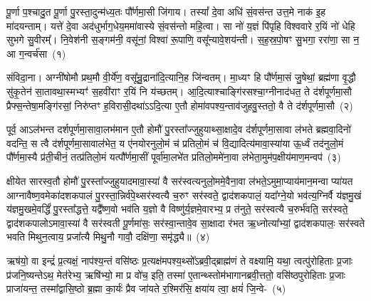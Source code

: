 \setcounter{anuvakam}{0}
पू॒र्णा प॒श्चादु॒त पू॒र्णा पु॒रस्ता॒दुन्म॑ध्य॒तः पौ᳚र्णमा॒सी जि॑गाय। तस्यां᳚ दे॒वा अधि॑ सं॒वस॑न्त उत्त॒मे नाक॑ इ॒ह मा॑दयन्ताम्। यत्ते॑ दे॒वा अद॑धुर्भाग॒\-धेय॒ममा॑वास्ये सं॒वस॑न्तो महि॒त्वा। सा नो॑ य॒ज्ञं पि॑पृहि विश्ववारे र॒यिं नो॑ धेहि सुभगे सु॒वीरम्᳚। नि॒वेश॑नी स॒ङ्गम॑नी॒ वसू॑नां॒ विश्वा॑ रू॒पाणि॒ वसू᳚न्यावे॒शय॑न्ती। स॒ह॒स्र॒पो॒षꣳ सु॒भगा॒ ररा॑णा॒ सा न॒ आ ग॒न्वर्च॑सा~(१)\ip

संविदा॒ना। अग्नी॑षोमौ प्रथ॒मौ वी॒र्ये॑ण॒ वसू᳚न्रु॒द्राना॑दि॒त्यानि॒ह जि॑न्वतम्। मा॒ध्यꣳ हि पौ᳚र्णमा॒सं जु॒षेथां॒ ब्रह्म॑णा वृ॒द्धौ सु॑कृ॒तेन॑ सा॒तावथा॒स्मभ्यꣳ॑ स॒हवी॑राꣳ र॒यिं नि य॑च्छतम्। आ॒दि॒त्याश्चाङ्गि॑रसश्चा॒ग्नीनाद॑धत॒ ते द॑र्\mbox{}शपूर्णमा॒सौ प्रैफ्स॒न्तेषा॒\-मङ्गि॑रसां॒ निरु॑प्तꣳ ह॒विरासी॒दथा॑\-ऽऽ\-दि॒त्या ए॒तौ होमा॑वपश्य॒न्ता\-व॑जुहवु॒स्ततो॒ वै ते द॑र्\mbox{}शपूर्णमा॒सौ~(२)\ip

पूर्व॒ आ\-ऽल॑भन्त दर्\mbox{}श\-पूर्ण\-मा॒सावा॒लभ॑मान ए॒तौ होमौ॑ पु॒रस्ता᳚ज्जुहुयाथ्सा॒क्षादे॒व द॑र्\mbox{}शपूर्णमा॒सावा ल॑भते ब्रह्मवा॒दिनो॑ वदन्ति॒ स त्वै द॑र्\mbox{}शपूर्णमा॒सावा\-ल॑भेत॒ य ए॑नयोरनुलो॒मं च॑ प्रतिलो॒मं च॑ वि॒द्यादित्य॑मावा॒स्या॑या ऊ॒र्ध्वं तद॑नुलो॒मं पौ᳚र्णमा॒स्यै प्र॑ती॒चीनं॒ तत्प्र॑तिलो॒मं यत्पौ᳚र्णमा॒सीं पूर्वा॑मा॒लभे॑त प्रतिलो॒ममे॑ना॒वा ल॑भेता॒मुम॑प॒क्षीय॑माण॒मन्वप॑~(३)\ip

क्षीयेत सारस्व॒तौ होमौ॑ पु॒रस्ता᳚ज्जुहुयादमावा॒स्या॑ वै सर॑स्वत्यनुलो॒ममे॒वैना॒वा ल॑भते॒\-ऽमुमा॒प्याय॑मान॒मन्वा प्या॑यत आग्नावैष्ण॒वमेका॑\-दश\-कपालं पु॒रस्ता॒न्निर्व॑पे॒थ्सर॑स्वत्यै च॒रुꣳ सर॑स्वते॒ द्वाद॑श\-कपालं॒ यदा᳚ग्ने॒यो भव॑त्य॒ग्निर्वै य॑ज्ञमु॒खं य॑ज्ञमु॒खमे॒वर्द्धिं॑ पु॒रस्ता᳚द्धत्ते॒ यद्वै᳚ष्ण॒वो भव॑ति य॒ज्ञो वै विष्णु॑र्य॒ज्ञमे॒वारभ्य॒ प्र त॑नुते॒ सर॑स्वत्यै च॒रुर्भ॑वति॒ सर॑स्वते॒ द्वाद॑श\-कपालो\-ऽमावा॒स्या॑ वै सर॑स्वती पू॒र्णमा॑सः॒ सर॑स्वा॒न्तावे॒व सा॒क्षादा र॑भत ऋ॒ध्नोत्या᳚भ्यां॒ द्वाद॑श\-कपालः॒ सर॑स्वते भवति मिथुन॒त्वाय॒ प्रजा᳚त्यै मिथु॒नौ गावौ॒ दक्षि॑णा॒ समृ॑द्ध्यै॥~(४)\ip

{}

ऋष॑यो॒ वा इन्द्रं॑ प्र॒त्यक्षं॒ नाप॑श्य॒न्तं वसि॑ष्ठः प्र॒त्यक्ष॑मपश्य॒थ्सो᳚\-ऽब्रवी॒द्ब्राह्म॑णं ते वक्ष्यामि॒ यथा॒ त्वत्पु॑रोहिताः प्र॒जाः प्र॑जनि॒ष्यन्ते\-ऽथ॒ मेत॑रेभ्य॒ ऋषि॑भ्यो॒ मा प्र वो॑च॒ इति॒ तस्मा॑ ए॒तान्थ्स्तोम॑भागानब्रवी॒त्ततो॒ वसि॑ष्ठपुरोहिताः प्र॒जाः प्राजा॑यन्त॒ तस्मा᳚द्\-वासि॒ष्ठो ब्र॒ह्मा का॒र्यः॑ प्रैव जा॑यते र॒श्मिर॑सि॒ क्षया॑य त्वा॒ क्षयं॑ जि॒न्वे-~(५)\ip

